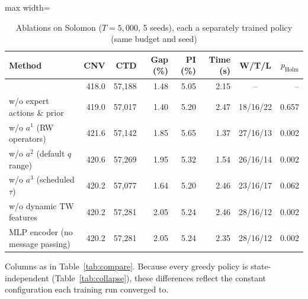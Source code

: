 \begin{table}[t]
\centering
\caption{Ablations on Solomon ($T=5{,}000$, 5 seeds), each a separately trained policy (same budget and seed)}\label{tab:ablation}
\setlength{\tabcolsep}{2.5pt}
\begin{adjustbox}{max width=\linewidth}
\begin{tabular}{lrrrrrcr}
\toprule
Method & CNV & CTD & Gap (\%) & PI (\%) & Time (s) & W/T/L & $p_{\text{Holm}}$\\ \midrule
\sgalns{} & 418.0 & 57,188 & 1.48 & 5.05 & 2.15 & -- & -- \\ \midrule
w/o expert actions \& prior & 419.0 & 57,017 & 1.40 & 5.20 & 2.47 & 18/16/22 & 0.657\\
w/o $a^1$ (RW operators) & 421.6 & 57,142 & 1.85 & 5.65 & 1.37 & 27/16/13 & 0.002\\
w/o $a^2$ (default $q$ range) & 420.6 & 57,269 & 1.95 & 5.32 & 1.54 & 26/16/14 & 0.002\\
w/o $a^3$ (scheduled $\tau$) & 420.2 & 57,077 & 1.64 & 5.20 & 2.46 & 23/16/17 & 0.062\\
w/o dynamic TW features & 420.2 & 57,281 & 2.05 & 5.24 & 2.46 & 28/16/12 & 0.002\\
MLP encoder (no message passing) & 420.2 & 57,281 & 2.05 & 5.24 & 2.35 & 28/16/12 & 0.002\\
\bottomrule
\end{tabular}
\end{adjustbox}
\par\vspace{2pt}\parbox{\linewidth}{\footnotesize Columns as in Table~\ref{tab:compare}. Because every greedy policy is state-independent (Table~\ref{tab:collapse}), these differences reflect the constant configuration each training run converged to.}
\end{table}
